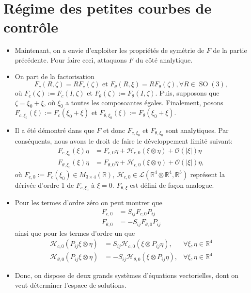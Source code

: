 \documentclass[12pt,a4paper]{article}
\theoremstyle{plain}
\theoremstyle{plain}
\theoremstyle{plain}
\theoremstyle{definition}
\theoremstyle{definition}
\theoremstyle{definition}
\theoremstyle{plain}
\newcommand{\R}{\mathbb{R}}
\newcommand{\h}{\mathcal{H}}
\DeclareMathOperator{\SO}{SO}
\begin{document}
\section{Régime des petites courbes de contrôle}
\begin{itemize}
\item Maintenant, on a envie d'exploiter les propriétés de symétrie de $F$ de la partie précédente. Pour faire ceci, attaquons $F$ du côté analytique. 

\item On part de la factorisation
\begin{equation}
\label{eq: reminder control system}
	F_{c}(R, \zeta) = R F_{c}(\zeta) \text{ et } F_{\theta}(R, \xi) = R F_{\theta}(\zeta), \forall R \in \SO(3),
\end{equation}
où $F_{c}(\zeta) := F_c(I, \zeta)$ et $F_{\theta}(\zeta) := F_{\theta}(I, \zeta)$. Puis, supposons que $\zeta = \xi_0 + \xi$, où $\xi_0$ a toutes les composoantes égales. Finalement, posons $F_{c, \xi_0}(\xi) := F_{c}(\xi_0 + \xi)$ et $F_{\theta, \xi_0}(\xi) := F_{\theta}(\xi_0 + \xi)$.

\item Il a été démontré dans \cite{Alouges2013} que $F$ et donc $F_{c, \xi_0}$ et $F_{\theta, \xi_0}$ sont analytiques. Par conséquents, nous avons le droit de faire le développement limité suivant:
\begin{align}
\label{eq: spatial control expansion}
	F_{c, \xi_0}(\xi)\eta &= F_{c, 0} \eta  + \h_{c,0}(\xi \otimes \eta) + \mathcal{O}(|\xi|)\eta\\
\label{eq: angular control expansion}
	F_{\theta, \xi_0}(\xi) \eta &= F_{\theta, 0} \eta + \h_{c, 0}(\xi \otimes \eta) + \mathcal{O}(|\xi|)\eta,
\end{align}
où $F_{c,0} := F_{c}(\xi_0) \in M_{3 \times 4}(\R)$, $\h_{c,0}\in \mathcal{L}(\R^4 \otimes \R^4, \R^3)$ représent la dérivée d'ordre 1 de $F_{c, \xi_0}$ à $\xi = 0$. $F_{\theta, \xi}$ est défini de façon analogue.

\item Pour les termes d'ordre zéro on peut montrer que
\begin{align}
\label{eq:zeroth_order_sym}
	F_{c,0} &= S_{ij} F_{c,0} P_{ij}\\
	F_{\theta, 0} &= -S_{ij} F_{\theta, 0} P_{ij}
\end{align}
ainsi que pour les termes d'ordre un que
\begin{align}
\label{eq:first_order_sym}
\h_{c,0}(P_{ij} \xi\otimes \eta) &= S_{ij} \h_{c,0}(\xi \otimes P_{ij} \eta), &\forall \xi, \eta \in \R^4\\
\h_{\theta,0}(P_{ij} \xi \otimes \eta) &= -S_{ij} \h_{\theta,0}(\xi \otimes P_{ij} \eta), &\forall \xi, \eta \in \R^4
\end{align}

\item Donc, on dispose de deux grands systèmes d'équations vectorielles, dont on veut déterminer l'espace de solutions.
\end{itemize}
\end{document}
